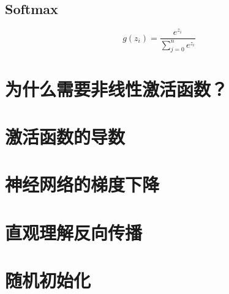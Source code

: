 \documentclass[../../main.tex]{subfiles}
\begin{document}
\subsection{Softmax}
\[
    g(z_i) = \frac{e^{z_i}}{\sum\limits_{j=0}^n{e^{z_i}}}
\]

\section{为什么需要非线性激活函数？}

\section{激活函数的导数}

\section{神经网络的梯度下降}

\section{直观理解反向传播}

\section{随机初始化}
\end{document}

